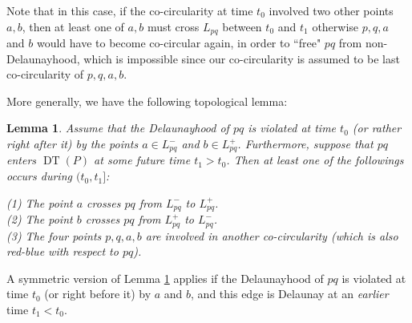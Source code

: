 \documentclass[letter,11pt]{article}
\newtheorem{lemma}[theorem]{Lemma}
\def \L{{L}}
\def\DT{\mathop{\mathrm{DT}}}
\begin{document}
Note that in this case, if the co-circularity at time $t_0$ involved two other points $a,b$, then at least one of $a,b$ must cross $\L_{pq}$ between $t_0$ and $t_1$ otherwise $p,q,a$ and $b$ would have to become co-circular again, in order to ``free" $pq$ from non-Delaunayhood, which is impossible since our co-circularity is assumed to be {last} co-circularity of $p,q,a,b$.

More generally, we have the following topological lemma:
\begin{lemma}\label{Lemma:MustCross}
Assume that the Delaunayhood of $pq$ is violated at time $t_0$ (or rather right after it) by the points $a\in \L_{pq}^-$ and $b\in \L_{pq}^+$. 
Furthermore, suppose that $pq$ enters $\DT(P)$ at some future time $t_1>t_0$.
Then at least one of the followings occurs during $(t_0,t_1]$: 

\medskip
(1) The point $a$ crosses $pq$ from $\L_{pq}^-$ to $\L_{pq}^+$.\\
\indent(2) The point $b$ crosses $pq$ from $\L_{pq}^+$ to $\L_{pq}^-$.\\
\indent(3) The four points $p,q,a,b$ are involved in another co-circularity (which is also red-blue with respect to $pq$). \end{lemma}

A symmetric version of Lemma \ref{Lemma:MustCross} applies if the Delaunayhood of $pq$ is violated at time $t_0$ (or right before it) by $a$ and $b$, and this edge is Delaunay at an {\it earlier} time $t_1<t_0$.
\end{document}
